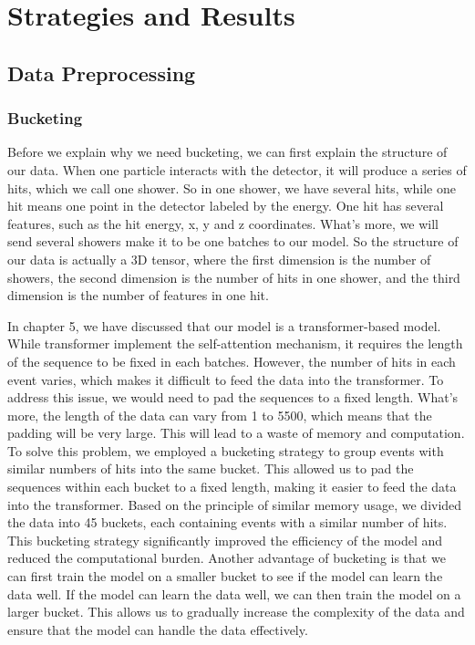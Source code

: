 \chapter{Strategies and Results}
\section{Data Preprocessing}

\subsection{Bucketing}
Before we explain why we need bucketing, we can first explain the structure of our data. When one particle interacts with the detector, it will produce a series of hits, which we call one shower. So in one shower, we have several hits, while one hit means one point in the detector labeled by the energy. One hit has several features, such as the hit energy, x, y and z coordinates. What's more, we will send several showers make it to be one batches to our model. So the structure of our data is actually a 3D tensor, where the first dimension is the number of showers, the second dimension is the number of hits in one shower, and the third dimension is the number of features in one hit.

In chapter 5, we have discussed that our model is a transformer-based model. While transformer implement the self-attention mechanism, it requires the length of the sequence to be fixed in each batches. However, the number of hits in each event varies, which makes it difficult to feed the data into the transformer. To address this issue, we would need to pad the sequences to a fixed length. What's more, the length of the data can vary from 1 to 5500, which means that the padding will be very large. This will lead to a waste of memory and computation. To solve this problem, we employed a bucketing strategy to group events with similar numbers of hits into the same bucket. This allowed us to pad the sequences within each bucket to a fixed length, making it easier to feed the data into the transformer. Based on the principle of similar memory usage, we divided the data into 45 buckets, each containing events with a similar number of hits. This bucketing strategy significantly improved the efficiency of the model and reduced the computational burden. Another advantage of bucketing is that we can first train the model on a smaller bucket to see if the model can learn the data well. If the model can learn the data well, we can then train the model on a larger bucket. This allows us to gradually increase the complexity of the data and ensure that the model can handle the data effectively.
